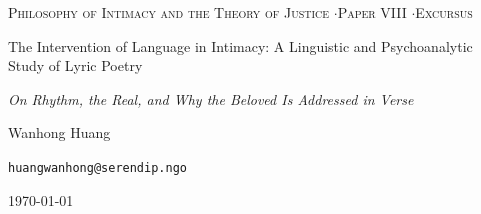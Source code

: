 \documentclass[11pt,a4paper]{article}
\begin{document}
\thispagestyle{empty}
\null\vfill
\begin{center}
{\footnotesize\color{rosedeep}\scshape Philosophy of Intimacy and the Theory of Justice \quad$\cdot$\quad Paper VIII \quad$\cdot$\quad Excursus\par}
\vspace{0.9em}
\coverrule\par
\vspace{1.6em}
{\color{warnred}\Large The Intervention of Language in Intimacy: A Linguistic and Psychoanalytic Study of Lyric Poetry\par}
\vspace{1.0em}
{\color{warnred}\large\itshape On Rhythm, the Real, and Why the Beloved Is Addressed in Verse\par}
\vspace{2.4em}
\coverrule[0.25]\par
\vspace{1.4em}
{\large Wanhong Huang\par}
\vspace{0.5em}
{\footnotesize \texttt{huangwanhong@serendip.ngo}\par}
\vspace{1.2em}
{\today\par}
\end{center}
\vfill\null
\coverfootnote
\clearpage
\end{document}
